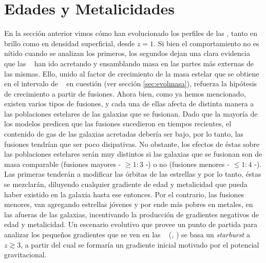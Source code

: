 

\section{Edades y Metalicidades}
\label{sec:estrellas}
 En la secci\'on anterior vimos c\'omo han evolucionado los perfiles de las \bcgs, tanto
 en brillo como en densidad superficial, desde $z=1$. Si bien el comportamiento
 no es n\'itido cuando se analizan los primeros, los segundos dejan una clara evidencia que las
 \bcgs~ han ido acretando y ensamblando masa en las partes m\'as externas de las mismas.
 Ello, unido al factor de crecimiento de la masa estelar que se
 obtiene en el intervalo de \z~ en cuesti\'on (ver secci\'on \ref{sec:evolmasa}),
 refuerza la hip\'otesis de crecimiento a partir de fusiones. Ahora bien, como ya hemos
 mencionado, existen varios tipos de fusiones, y cada una de ellas afecta de distinta manera
 a las poblaciones estelares de las galaxias que se fusionan. Dado que la mayor\'ia de los
 modelos predicen que las fusiones sucedieron en tiempos recientes, el contenido de gas
 de las galaxias acretadas deber\'ia ser bajo, por lo tanto, las fusiones tendr\'ian que
 ser poco disipativas. No obstante, los efectos de \'estas sobre las poblaciones estelares ser\'an
 muy distintos si las galaxias que se fusionan son de masa comparable (fusiones mayores - $\geq1:3$ -) o no (fusiones
 menores - $\leq 1:4$ -). Las primeras tender\'an a modificar las \'orbitas
 de las estrellas y por lo tanto, \'estas se mezclar\'an, diluyendo cualquier gradiente de edad
 y metalicidad que pueda haber existido en la galaxia hasta ese entonces. Por el contrario, 
 las fusiones menores, van agregando estrellas j\'ovenes y por ende m\'as pobres en metales,
 en las afueras de las galaxias, incentivando la producci\'on de gradientes negativos de edad y metalicidad.
 Un escenario evolutivo que provee un punto de partida para analizar los peque\~nos gradientes
 que se ven en las \bcgs~ (\cite{lou12}, \cite{oli15}) se basa 
 un \textit{starburst} a $z\gtrsim3$, a partir del cual
 se formar\'ia un gradiente inicial motivado por el potencial gravitacional.
